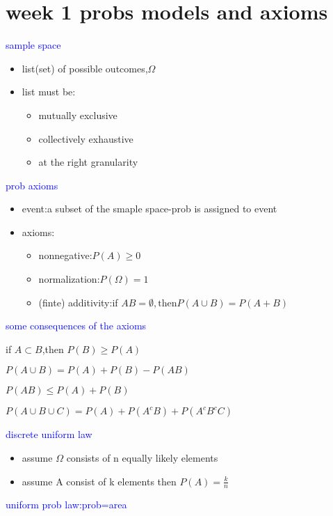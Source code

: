 \section*{week 1 probs models and axioms}

\textcolor{blue}{sample space}

\begin{itemize}
    \item list(set) of possible outcomes,$\Omega$
    \item list must be:
    \begin{itemize}
        \item mutually exclusive
        \item collectively exhaustive
        \item at the right granularity
    \end{itemize}
\end{itemize}


\textcolor{blue}{prob axioms}

\begin{itemize}
    \item event:a subset of the smaple space-prob is assigned to event
    \item axioms:
    \begin{itemize}
        \item nonnegative:$P(A)\geq 0$
        \item normalization:$P(\Omega)=1$
        \item (finte) additivity:if $AB=\emptyset,\text{then} P(A\cup B)=P(A+B)$
    \end{itemize}
\end{itemize}

\textcolor{blue}{some consequences of the axioms}

if $A\subset B$,then $P(B)\geq P(A)$

$P(A\cup B)=P(A)+P(B)-P(AB)$

$P(AB)\leq P(A)+P(B)$

$P(A\cup B \cup C)=P(A)+P(A^c B)+P(A^c B^c C)$


\textcolor{blue}{discrete uniform law}

\begin{itemize}
    \item assume $\Omega$ consists of n equally likely elements
    \item assume A consist of k elements then $P(A)=\frac{k}{n}$
\end{itemize}


\textcolor{blue}{uniform prob law:prob=area}


